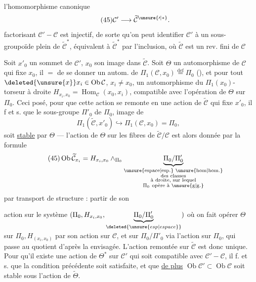 l'homomorphisme canonique
\[
\tag{45}\mathcal C'\longrightarrow\widetilde{\mathcal C}^{\unsure{\prime|*}}.
\]
 factorisant $\mathcal C'\mathbin{-}\mathcal C$ est injectif, de sorte qu'on peut identifier $\mathcal C'$ à un sous-groupoïde plein de $\widetilde{\mathcal C}^{*}$, équivalent à $\widetilde{\mathcal C}^{*}$ par l'inclusion, où $\widetilde{\mathcal C}$ est un rev. fini de $\mathcal C$

Soit $x'_0$ un sommet de $\mathcal C'$, $x_0$ son image dans $\widetilde{\mathcal C}$. Soit $\Theta$ un automorphisme de $\mathcal C$ qui fixe $x_0$, il   $=$ de se donner un autom. de  $\Pi_1(\mathcal C,x_0)\overset{\mathrm{def}}{=}\Pi_0$ (), et pour tout  $\deleted{\unsure{x}}x_i\in\operatorname{Ob}\mathcal C$, $x_i\ne x_0$, un automorphisme du $\Pi_1(x_0)$-torseur à droite $H_{x_i,x_0}=\operatorname{Hom}_{\mathcal C}(x_0,x_i)$, compatible avec l'opération de $\Theta$ sur $\Pi_0$. Ceci posé, pour que cette action se remonte en une action de $\widetilde{\mathcal C}$ qui fixe $x'_0$, il f et s. que le sous-groupe $\Pi'_0$ de $\Pi_0$, image de 
\[
\Pi_1(\widetilde{\mathcal C},x'_0)\hookrightarrow\Pi_1(\mathcal C,x_0)=\Pi_0,
\]
soit \uline{stable} par $\Theta$ --- l'action de $\Theta$ sur les fibres  de $\widetilde{\mathcal C}/\mathcal C$ est alors donnée par la formule
\[
\tag{45}\operatorname{Ob}\widetilde{\mathcal C}_{x_i}=H_{x_i,x_0}\wedge_{\Pi_0}\underbrace{\Pi_0/\Pi'_0}_{\substack{\text{\unsure{espace|esp.} \unsure{hom|hom.}}\\\text{des classes}\\\text{à droite, sur lequel}\\\Pi_0\ \text{opère à \unsure{g|g.}}}}
\]
par transport de structure : partir de son

action sur  le système $(\Pi_0,H_{x_i,x_0},\underbrace{\Pi_0/\Pi'_0}_{\deleted{\unsure{esp|espace}}})$ où on fait opérer $\Theta$ sur $\Pi_0,H_{(x_i,x_0)}$ par son action sur $\mathcal C$, et sur $\Pi_0/\Pi'_0$ via l'action sur $\Pi_0$, qui passe au quotient d'après la    envisagée. L'action  remontée   sur $\widetilde{\mathcal C}$ est donc unique. Pour qu'il existe une action de $\Theta^{*}$ sur $\mathcal C'$ qui soit compatible avec $\mathcal C'-\mathcal C$, il f. et s. que la condition précédente soit satisfaite, et que \uline{de plus} $\operatorname{Ob}\mathcal C'\subset\operatorname{Ob}\mathcal C$ soit stable sous  l'action de $\widetilde\Theta$.

